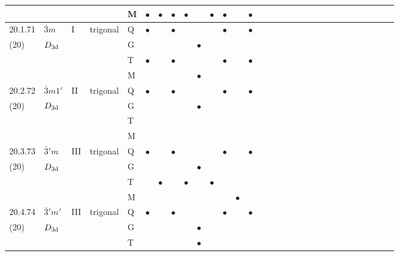 \documentclass[fleqn,9pt,landscape]{jsarticle}
\begin{document}
\begin{longtable}{lllll|l|l|l|l|l|l|l|l|l|ll|ll|ll|ll|ll|ll|ll|ll}
 &  &  &  & M & $\bullet$ & $\bullet$ & $\bullet$ & $\bullet$ &  & $\bullet$ & $\bullet$ &  & $\bullet$ &  &  &  &  &  &  &  &  &  &  &  &  &  &  &  &  \\ \hline
20.1.71 & \texttt{$\bar{3}m$} & I & trigonal & Q & $\bullet$ &  & $\bullet$ &  &  &  & $\bullet$ &  & $\bullet$ &  &  &  &  &  &  &  &  &  &  &  &  &  &  &  &  \\
(20) & $D_{\rm 3d}$ &  &  & G &  &  &  &  & $\bullet$ &  &  &  &  &  &  &  &  &  &  &  &  &  &  &  &  &  &  &  &  \\
 &  &  &  & T & $\bullet$ &  & $\bullet$ &  &  &  & $\bullet$ &  & $\bullet$ &  &  &  &  &  &  &  &  &  &  &  &  &  &  &  &  \\
 &  &  &  & M &  &  &  &  & $\bullet$ &  &  &  &  &  &  &  &  &  &  &  &  &  &  &  &  &  &  &  &  \\ \hline
20.2.72 & \texttt{$\bar{3}m1'$} & II & trigonal & Q & $\bullet$ &  & $\bullet$ &  &  &  & $\bullet$ &  & $\bullet$ &  &  &  &  &  &  &  &  &  &  &  &  &  &  &  &  \\
(20) & $D_{\rm 3d}$ &  &  & G &  &  &  &  & $\bullet$ &  &  &  &  &  &  &  &  &  &  &  &  &  &  &  &  &  &  &  &  \\
 &  &  &  & T &  &  &  &  &  &  &  &  &  &  &  &  &  &  &  &  &  &  &  &  &  &  &  &  &  \\
 &  &  &  & M &  &  &  &  &  &  &  &  &  &  &  &  &  &  &  &  &  &  &  &  &  &  &  &  &  \\ \hline
20.3.73 & \texttt{$\bar{3}'m$} & III & trigonal & Q & $\bullet$ &  & $\bullet$ &  &  &  & $\bullet$ &  & $\bullet$ &  &  &  &  &  &  &  &  &  &  &  &  &  &  &  &  \\
(20) & $D_{\rm 3d}$ &  &  & G &  &  &  &  & $\bullet$ &  &  &  &  &  &  &  &  &  &  &  &  &  &  &  &  &  &  &  &  \\
 &  &  &  & T &  & $\bullet$ &  & $\bullet$ &  & $\bullet$ &  &  &  &  &  &  &  &  &  &  &  &  &  &  &  &  &  &  &  \\
 &  &  &  & M &  &  &  &  &  &  &  & $\bullet$ &  &  &  &  &  &  &  &  &  &  &  &  &  &  &  &  &  \\ \hline
20.4.74 & \texttt{$\bar{3}'m'$} & III & trigonal & Q & $\bullet$ &  & $\bullet$ &  &  &  & $\bullet$ &  & $\bullet$ &  &  &  &  &  &  &  &  &  &  &  &  &  &  &  &  \\
(20) & $D_{\rm 3d}$ &  &  & G &  &  &  &  & $\bullet$ &  &  &  &  &  &  &  &  &  &  &  &  &  &  &  &  &  &  &  &  \\
 &  &  &  & T &  &  &  &  & $\bullet$ &  &  &  &  &  &  &  &  &  &  &  &  &  &  &  &  &  &  &  &  \\

\end{longtable}
\end{document}
